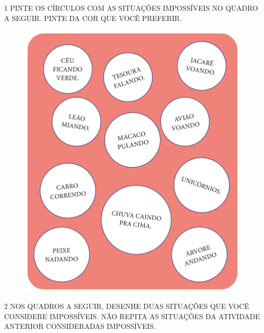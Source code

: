 

\num{1} PINTE OS CÍRCULOS COM AS SITUAÇÕES IMPOSSÍVEIS NO QUADRO A SEGUIR. PINTE
DA COR QUE VOCÊ PREFERIR.


\begin{figure}[htpb!]
\centering
\includegraphics[width=.8\textwidth]{../ilustracoes/MAT1/SAEB_1ANO_MAT_FIGURA84.png}
\end{figure}


\pagebreak
\num{2} NOS QUADROS A SEGUIR, DESENHE DUAS SITUAÇÕES QUE VOCÊ CONSIDERE
IMPOSSÍVEIS. NÃO REPITA AS SITUAÇÕES DA ATIVIDADE ANTERIOR CONSIDERADAS IMPOSSÍVEIS.

\begin{mdframed}[linewidth=2pt,linecolor=salmao,roundcorner=10pt]
\vspace{8cm}
\end{mdframed}

